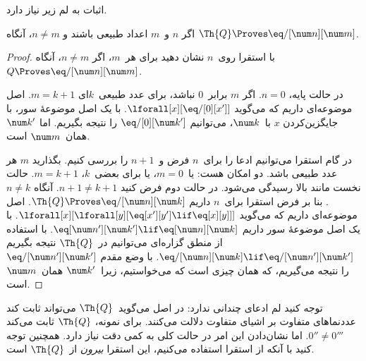 \documentclass[../../../include/open-logic-section]{subfiles}
\begin{document}
اثبات به لم زیر نیاز دارد.

\begin{lem}
 اگر $n$ و~$m$ اعداد طبیعی باشند و
$n\neq m$، آنگاه $\Th{Q}\Proves\eq/[\num n][\num m]$.
\end{lem}

\begin{proof}
با استقرا روی~$n$ نشان دهید برای هر~$m$، اگر $n\neq m$، آنگاه
$Q\Proves\eq/[\num n][\num m]$.

در حالت پایه، $n=0$. اگر $m$ برابر~$0$ نباشد، برای عدد طبیعی~$k$ای
$m=k+1$. اصل موضوعه‌ای داریم که می‌گوید
$\lforall[x][\eq/[0][x']]$. با یک اصل موضوعهٔ سور، با جایگزین‌کردن
$x$ با~$\num k$، می‌توانیم $\eq/[0][\num k']$ را نتیجه بگیریم. اما
$\num k'$ همان~$\num m$ است.

در گام استقرا می‌توانیم ادعا را برای~$n$ فرض و~$n+1$ را بررسی کنیم.
بگذارید $m$ هر عدد طبیعی باشد. دو امکان هست: یا~$m=0$، یا برای
بعضی~$k$، $m=k+1$. حالت نخست مانند بالا رسیدگی می‌شود. در حالت دوم
فرض کنید $n+1\neq k+1$. آنگاه $n\neq k$. بنا بر فرض استقرا برای~$n$
داریم $\Th{Q}\Proves\eq/[\num n][\num k]$. اصل موضوعه‌ای داریم که
می‌گوید
$\lforall[x][\lforall[y][\eq[x'][y']\lif\eq[x][y]]]$. با یک اصل
موضوعهٔ سور داریم
$\eq[\num n'][\num k']\lif\eq[\num n][\num k]$. با استفاده از
منطق گزاره‌ای می‌توانیم در~$\Th{Q}$ نتیجه بگیریم
$\eq/[\num n][\num k]\lif\eq/[\num n'][\num k']$. با وضع مقدم
$\eq/[\num n'][\num k']$ را نتیجه می‌گیریم، که همان چیزی است که
می‌خواستیم، زیرا~$\num k'$ همان~$\num m$ است.
\end{proof}

\begin{explain}
توجه کنید لم ادعای چندانی ندارد: در اصل می‌گوید~$\Th{Q}$ می‌تواند
ثابت کند عددنماهای متفاوت بر اشیای متفاوت دلالت می‌کنند. برای نمونه،
$\Th{Q}$ ثابت می‌کند $0''\neq0'''$. اما نشان‌دادن این امر در حالت
کلی به کمی دقت نیاز دارد. همچنین توجه کنید با آنکه از استقرا استفاده
می‌کنیم، این استقرا \emph{بیرون} از~$\Th{Q}$ است.
\end{explain}
\end{document}
